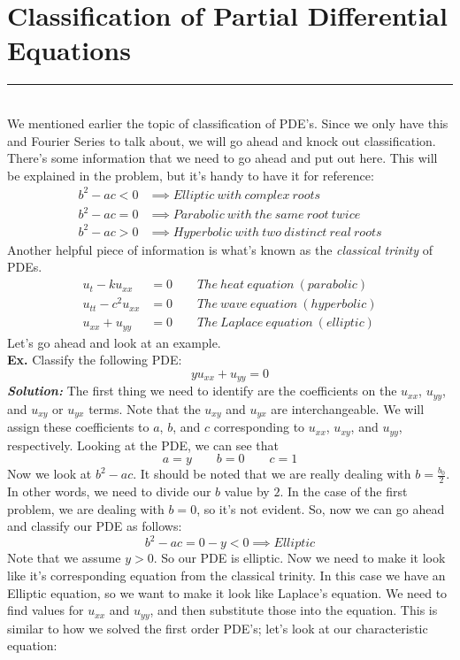 \documentclass{article}
\begin{document}
\section{Classification of Partial Differential Equations}
\hrule
\noindent\\
\indent We mentioned earlier the topic of classification of PDE's. Since we only have this and Fourier Series to talk about, we will go ahead and knock out classification. There's some information that we need to go ahead and put out here. This will be explained in the problem, but it's handy to have it for reference: 
\begin{align*}
b^{2} - ac < 0 &\implies Elliptic\ with\ complex\ roots\\
b^{2} - ac = 0 &\implies Parabolic\ with\ the\ same\ root\ twice\\
b^{2} - ac > 0 &\implies Hyperbolic\ with\ two\ distinct\ real\ roots
\end{align*}
\noindent Another helpful piece of information is what's known as the \textit{classical trinity} of PDEs.
\begin{align*}
u_{t} - ku_{xx} &= 0 \qquad The\ heat\ equation\ (parabolic)\\
u_{tt} - c^{2}u_{xx} &= 0 \qquad The\ wave\ equation\ (hyperbolic)\\
u_{xx} + u_{yy} &= 0 \qquad The\ Laplace\ equation\ (elliptic)
\end{align*}
Let's go ahead and look at an example.\\
\indent \textbf{Ex. }Classify the following PDE:
\[yu_{xx} + u_{yy} = 0\]
\indent \textbf{\textit{Solution:}} The first thing we need to identify are the coefficients on the $u_{xx}$, $u_{yy}$, and $u_{xy}$ or $u_{yx}$ terms. Note that the $u_{xy}$ and $u_{yx}$ are interchangeable. We will assign these coefficients to $a$, $b$, and $c$ corresponding to $u_{xx}$, $u_{xy}$, and $u_{yy}$, respectively. Looking at the PDE, we can see that
\[
a = y \qquad b = 0 \qquad c = 1
\]
\noindent Now we look at $b^{2} - ac$. It should be noted that we are really dealing with $b = \frac{b_{0}}{2}$. In other words, we need to divide our $b$ value by $2$. In the case of the first problem, we are dealing with $b = 0$, so it's not evident. So, now we can go ahead and classify our PDE as follows:
\[
b^{2} - ac = 0 - y < 0 \implies Elliptic
\]
Note that we assume $y > 0$. So our PDE is elliptic. Now we need to make it look like it's corresponding equation from the classical trinity. In this case we have an Elliptic equation, so we want to make it look like Laplace's equation. We need to find values for $u_{xx}$ and $u_{yy}$, and then substitute those into the equation. This is similar to how we solved the first order PDE's; let's look at our characteristic equation:
\end{document}
